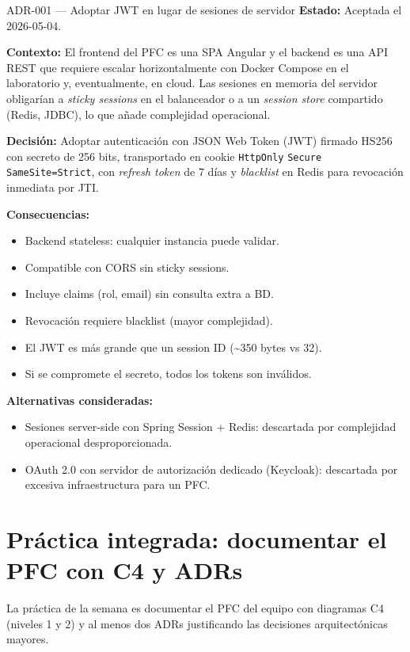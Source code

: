 \documentclass[11pt,a4paper,openany]{book}
\begin{document}
\begin{cajaadr}{ADR-001 --- Adoptar JWT en lugar de sesiones de servidor}
\textbf{Estado:} Aceptada el 2026-05-04.

\textbf{Contexto:} El frontend del PFC es una SPA Angular y el
backend es una API REST que requiere escalar horizontalmente con
Docker Compose en el laboratorio y, eventualmente, en cloud. Las
sesiones en memoria del servidor obligarían a \emph{sticky sessions}
en el balanceador o a un \emph{session store} compartido (Redis,
JDBC), lo que añade complejidad operacional.

\textbf{Decisión:} Adoptar autenticación con JSON Web Token (JWT)
firmado HS256 con secreto de 256 bits, transportado en cookie
\texttt{HttpOnly} \texttt{Secure} \texttt{SameSite=Strict}, con
\emph{refresh token} de 7 días y \emph{blacklist} en Redis para
revocación inmediata por JTI.

\textbf{Consecuencias:}
\begin{itemize}
\item[(+)] Backend stateless: cualquier instancia puede validar.
\item[(+)] Compatible con CORS sin sticky sessions.
\item[(+)] Incluye claims (rol, email) sin consulta extra a BD.
\item[(--)] Revocación requiere blacklist (mayor complejidad).
\item[(--)] El JWT es más grande que un session ID (\textasciitilde 350 bytes vs 32).
\item[(--)] Si se compromete el secreto, todos los tokens son
inválidos.
\end{itemize}

\textbf{Alternativas consideradas:}
\begin{itemize}
\item Sesiones server-side con Spring Session + Redis: descartada
por complejidad operacional desproporcionada.
\item OAuth 2.0 con servidor de autorización dedicado (Keycloak):
descartada por excesiva infraestructura para un PFC.
\end{itemize}
\end{cajaadr}

\section{Práctica integrada: documentar el PFC con C4 y ADRs}

La práctica de la semana es documentar el PFC del equipo con
diagramas C4 (niveles 1 y 2) y al menos dos ADRs justificando las
decisiones arquitectónicas mayores.
\end{document}
